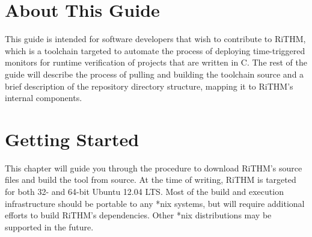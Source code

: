 \documentclass[12pt]{book}
\begin{document}


\pagestyle{plain}
\setcounter{page}{2}

\renewcommand\contentsname{Table of Contents}
\tableofcontents
\cleardoublepage
{}

\listoftables
\cleardoublepage
{}		%

\listoffigures
\cleardoublepage
{}		%



\pagestyle{fancy}
\renewcommand{\chaptermark}[1]{\markboth{#1}{}}
\renewcommand{\sectionmark}[1]{\markright{\thesection\ #1}}
\fancyhf{}
\fancyhead[LE,RO]{\small\bfseries\thepage}
\fancyhead[LO]{\footnotesize\bfseries\rightmark}
\fancyhead[RE]{\footnotesize\bfseries\leftmark}

\chapter*{About This Guide}
This guide is intended for software developers that wish to contribute to RiTHM, which is a toolchain targeted to automate the process of deploying time-triggered monitors for runtime verification of projects that are written in C. The rest of the guide will describe the process of pulling and building the toolchain source and a brief description of the repository directory structure, mapping it to RiTHM's internal components.

\chapter{Getting Started}
This chapter will guide you through the procedure to download RiTHM's source files and build the tool from source. At the time of writing, RiTHM is targeted for both 32- and 64-bit Ubuntu 12.04 LTS. Most of the build and execution infrastructure should be portable to any *nix systems, but will require additional efforts to build RiTHM's dependencies. Other *nix distributions may be supported in the future.
\end{document}
